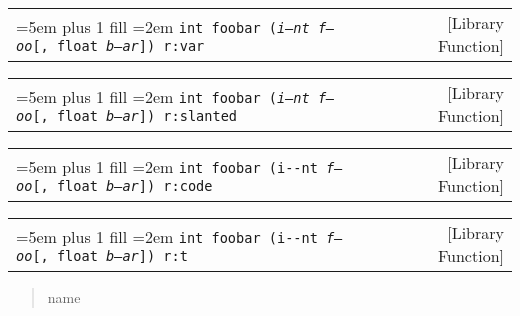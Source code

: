 \documentclass{book}
\newcommand\GNUTexinfocommandstyletextvar[1]{{\normalfont{}\textsl{#1}}}%
\begin{document}
%

\noindent\begin{tabularx}{\linewidth}{@{}Xr}
\rightskip=5em plus 1 fill
\hangindent=2em
\noindent\texttt{int foobar (\textnormal{\GNUTexinfocommandstyletextvar{i--nt}}\ \GNUTexinfocommandstyletextvar{f---oo}[,\ float\ \GNUTexinfocommandstyletextvar{b--ar}])\ r:var}& [Library Function]
\end{tabularx}

%

\noindent\begin{tabularx}{\linewidth}{@{}Xr}
\rightskip=5em plus 1 fill
\hangindent=2em
\noindent\texttt{int foobar (\textnormal{\textsl{i--nt}}\ \GNUTexinfocommandstyletextvar{f---oo}[,\ float\ \GNUTexinfocommandstyletextvar{b--ar}])\ r:slanted}& [Library Function]
\end{tabularx}

%

\noindent\begin{tabularx}{\linewidth}{@{}Xr}
\rightskip=5em plus 1 fill
\hangindent=2em
\noindent\texttt{int foobar (\textnormal{\texttt{i{-}{-}nt}}\ \GNUTexinfocommandstyletextvar{f---oo}[,\ float\ \GNUTexinfocommandstyletextvar{b--ar}])\ r:code}& [Library Function]
\end{tabularx}

%

\noindent\begin{tabularx}{\linewidth}{@{}Xr}
\rightskip=5em plus 1 fill
\hangindent=2em
\noindent\texttt{int foobar (\textnormal{\texttt{i{-}{-}nt}}\ \GNUTexinfocommandstyletextvar{f---oo}[,\ float\ \GNUTexinfocommandstyletextvar{b--ar}])\ r:t}& [Library Function]
\end{tabularx}

%
\begin{quote}
\unskip{\parskip=0pt\noindent}%
name
\end{quote}
\end{document}
